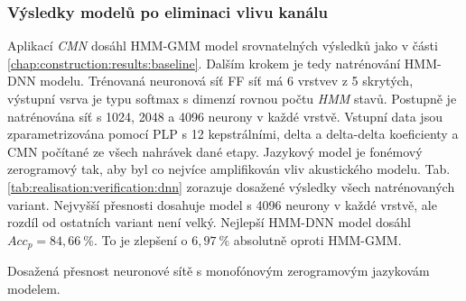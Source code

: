 \subsubsection{Výsledky modelů po eliminaci vlivu kanálu}

Aplikací \textit{CMN} dosáhl HMM-GMM model srovnatelných výsledků jako v části \ref{chap:construction:results:baseline}. Dalším krokem je tedy natrénování HMM-DNN modelu.
Trénovaná neuronová síť FF síť má 6 vrstvev z 5 skrytých, výstupní vsrva je typu softmax s dimenzí rovnou počtu \textit{HMM} stavů. Postupně je natrénována síť s 1024, 2048 a 4096 neurony v každé vrstvě. Vstupní data jsou zparametrizována pomocí PLP s 12 kepstrálními, delta a delta-delta koeficienty a CMN počítané ze všech nahrávek dané etapy. Jazykový model je fonémový zerogramový tak, aby byl co nejvíce amplifikován vliv akustického modelu. Tab. \ref{tab:realisation:verification:dnn} zorazuje dosažené výsledky všech natrénovaných variant. Nejvyšší přesnosti dosahuje model s 4096 neurony v každé vrstvě, ale rozdíl od ostatních variant není velký. Nejlepší HMM-DNN model dosáhl $Acc_{p} = 84,66\ \%$. To je zlepšení o $6,97\ \%$ absolutně oproti HMM-GMM.

\begin{table}[htpb]
  \centering
  \def\arraystretch{1.5}
  \caption{Dosažená přesnost neuronové sítě s monofónovým zerogramovým jazykovám modelem.}
  \label{tab:realisation:verification:dnn}
\end{table}
